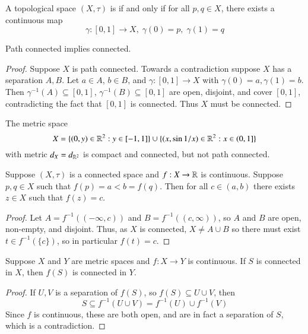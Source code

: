 \begin{definition}
    A topological space $(X,\tau)$ is  if and only if for all $p,q \in X$, there exists a continuous map $$\gamma:[0,1]\rightarrow X,\;\gamma(0) = p,\;\gamma(1) = q$$
\end{definition}

\begin{proposition}\label{prop:3.1.7}
    Path connected implies connected.
\end{proposition}
\begin{proof}
    Suppose $X$ is path connected. Towards a contradiction suppose $X$ has a separation $A,B$. Let $a \in A$, $b \in B$, and $\gamma:[0,1]\rightarrow X$ with $\gamma(0) = a,\gamma(1) = b$. Then $\gamma^{-1}(A) \subseteq [0,1]$, $\gamma^{-1}(B) \subseteq [0,1]$ are open, disjoint, and cover $[0,1]$, contradicting the fact that $[0,1]$ is connected. Thus $X$ must be connected.
\end{proof}

\begin{example}
    The metric space \begin{equation*}
        X = \{(0,y) \in\mathbb R^2:y\in[-1,1]\}\cup\{(x,\sin 1/x)\in \mathbb R^2:x \in (0,1]\}
    \end{equation*}
    with metric $d_X = d_{\mathbb R^2}$ is compact and connected, but not path connected.
\end{example}

\begin{theorem}
    Suppose $(X,\tau)$ is a connected space and $f:X\rightarrow \mathbb R$ is continuous. Suppose $p,q \in X$ such that $f(p) = a < b = f(q)$. Then for all $c \in (a,b)$ there exists $z \in X$ such that $f(z) = c$.
\end{theorem}
\begin{proof}
    Let $A = f^{-1}((-\infty,c))$ and $B = f^{-1}((c,\infty))$, so $A$ and $B$ are open, non-empty, and disjoint. Thus, as $X$ is connected, $X \neq A \cup B$ so there must exist $t \in f^{-1}(\{c\})$, so in particular $f(t) =c$.
\end{proof}

\begin{proposition}
    Suppose $X$ and $Y$ are metric spaces and $f:X\rightarrow Y$ is continuous. If $S$ is connected in $X$, then $f(S)$ is connected in $Y$.
\end{proposition}
\begin{proof}
    If $U,V$ is a separation of $f(S)$, so $f(S) \subseteq U\cup V$, then $$S \subseteq f^{-1}(U\cup V) = f^{-1}(U)\cup f^{-1}(V)$$ Since $f$ is continuous, these are both open, and are in fact a separation of $S$, which is a contradiction.
\end{proof}


